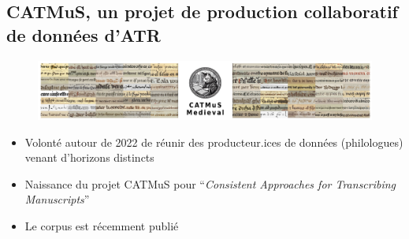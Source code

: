 \documentclass[11pt,aspectratio=169]{beamer}
\let\cite\parencite
\begin{document}
\subsection{CATMuS, un projet de production collaboratif de données d'ATR}

\begin{frame}
\begin{figure}
    \includegraphics[width=1\textwidth]{img/catmus_img.png}
\end{figure}
\begin{itemize}
\item Volonté autour de 2022 de réunir des producteur.ices de données (philologues) venant d'horizons distincts
\item Naissance du projet CATMuS pour \enquote{\textit{Consistent Approaches for Transcribing Manuscripts}}
\item Le corpus est récemment publié \cite{clerice_CATMuSMedievalMultilingual_2024a}
\end{itemize}
\end{frame}
\end{document}

